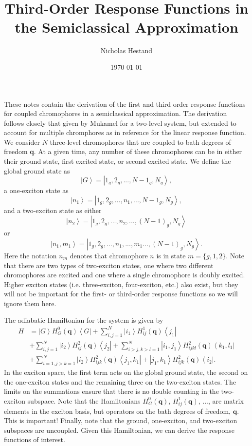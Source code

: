 \documentclass{article}
\newcommand{\bra}[1]{\ensuremath{\left\langle#1\right|}}
\newcommand{\ket}[1]{\ensuremath{\left|#1\right\rangle}}
\newcommand{\vect}[1]{\ensuremath{\boldsymbol{\mathbf{#1}}}}
\begin{document}
\title{Third-Order Response Functions in the Semiclassical Approximation}
\author{Nicholas Hestand}
\date{\today}
\maketitle

These notes contain the derivation of the first and third order response functions for coupled chromophores in a semiclassical approximation.
The derivation follows closely that given by Mukamel for a two-level system,\cite{Mukamel1995} but extended to account for multiple chromphores as in reference  for the linear response function.
We consider $N$ three-level chromophores that are coupled to bath degrees of freedom \vect{q}.
At a given time, any number of these chromophores can be in either their ground state, first excited state, or second excited state.
We define the global ground state as $$\ket{G}=\ket{1_{g},2_{g},...,N-1_{g},N_{g}},$$ a one-exciton state as $$\ket{n_{1}}=\ket{1_{g},2_{g},...,n_{1},...,N-1_{g},N_{g}},$$ and a two-exciton state as either $$\ket{n_{2}}=\ket{1_{g},2_{g},...,n_{2},...,(N-1)_{g},N_{g}}$$ or $$\ket{n_{1},m_{1}}=\ket{1_{g},2_{g},...,n_{1},...,m_{1}...,(N-1)_{g},N_{g}}.$$
Here the notation $n_{m}$ denotes that chromophore $n$ is in state $m=\{g,1,2\}$.
Note that there are two types of two-exciton states, one where two different chromophores are excited and one where a single chromophore is doubly excited.
Higher exciton states (i.e. three-exciton, four-exciton, etc.) also exist, but they will not be important for the first- or third-order response functions so we will ignore them here.

The adiabatic Hamiltonian for the system is given by
\begin{equation}
\begin{split}
 H&=\ket{G}H_{G}^{0}(\vect{q})\bra{G}+\sum_{i,j=1}^{N}\ket{i_{1}}H^{1}_{ij}(\vect{q})\bra{j_{1}}\\
 &+\sum_{i,j=1}^{N}\ket{i_{2}}H_{ij}^{2}(\vect{q})\bra{j_{2}}+\sum_{i>j,k>l=1}^{N}\ket{i_{1},j_{1}}H_{ijkl}^{2}(\vect{q})\bra{k_{1},l_{1}}\\
 &+\sum_{i=1,j>k=1}^{N}\ket{i_{2}}H_{ijk}^{2}(\vect{q})\bra{j_{1},k_{1}}+\ket{j_{1},k_{1}}H_{ijk}^{2}(\vect{q})\bra{i_{2}}.
\end{split}
\end{equation}
In the exciton space, the first term acts on the global ground state, the second on the one-exciton states and the remaining three on the two-exciton states.
The limits on the summations ensure that there is no double counting in the two-exciton subspace.
Note that the Hamiltonians $H_{G}^{0}(\vect q)$, $H_{ij}^{1}(\vect q)$, ..., are matrix elements in the exciton basis, but operators on the bath degrees of freedom, \vect{q}.
This is important!
Finally, note that the ground, one-exciton, and two-exciton subspaces are uncoupled.
Given this Hamiltonian, we can derive the response functions of interest.
\end{document}
